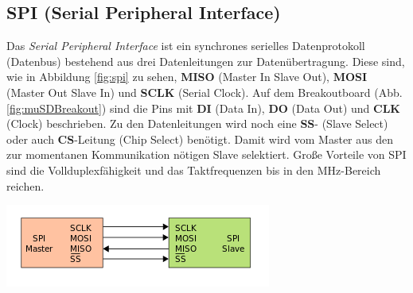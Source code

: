 \subsection{SPI (Serial Peripheral Interface)}
\label{subsubsec:spi}
\begin{minipage}{0.48\textwidth}
Das \textit{Serial Peripheral Interface} ist ein synchrones serielles Datenprotokoll (Datenbus) bestehend aus drei Datenleitungen zur Datenübertragung. Diese sind, wie in Abbildung \ref{fig:spi} zu sehen, \textbf{MISO} (Master In Slave Out), \textbf{MOSI} (Master Out Slave In) und \textbf{SCLK} (Serial Clock). Auf dem Breakoutboard (Abb. \ref{fig:muSDBreakout}) sind die Pins mit \textbf{DI} (Data In), \textbf{DO} (Data Out) und \textbf{CLK} (Clock) beschrieben. Zu den Datenleitungen wird noch eine \textbf{SS}- (Slave Select) oder auch \textbf{CS}-Leitung (Chip Select) benötigt. Damit wird vom Master aus den zur momentanen Kommunikation nötigen Slave selektiert. Große Vorteile von SPI sind die Vollduplexfähigkeit und das Taktfrequenzen bis in den MHz-Bereich reichen. \cite{spi}\cite{Wikipedia2018spi}\\
\end{minipage}
\begin{minipage}{0.51\textwidth}
\centering
\includegraphics[width=\textwidth]{graphics/Datenspeicherung/spi_master_slave.png}
\label{fig:spi}
\end{minipage}
